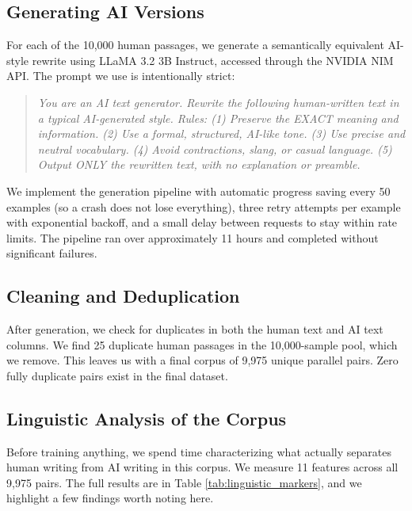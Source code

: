 \documentclass{article}
\begin{document}
\subsection{Generating AI Versions}

For each of the 10,000 human passages, we generate a semantically equivalent AI-style rewrite using LLaMA 3.2 3B Instruct, accessed through the NVIDIA NIM API. The prompt we use is intentionally strict:

\begin{quote}
\textit{You are an AI text generator. Rewrite the following human-written text in a typical AI-generated style. Rules: (1) Preserve the EXACT meaning and information. (2) Use a formal, structured, AI-like tone. (3) Use precise and neutral vocabulary. (4) Avoid contractions, slang, or casual language. (5) Output ONLY the rewritten text, with no explanation or preamble.}
\end{quote}

We implement the generation pipeline with automatic progress saving every 50 examples (so a crash does not lose everything), three retry attempts per example with exponential backoff, and a small delay between requests to stay within rate limits. The pipeline ran over approximately 11 hours and completed without significant failures.

\subsection{Cleaning and Deduplication}

After generation, we check for duplicates in both the human text and AI text columns. We find 25 duplicate human passages in the 10,000-sample pool, which we remove. This leaves us with a final corpus of 9,975 unique parallel pairs. Zero fully duplicate pairs exist in the final dataset.

\subsection{Linguistic Analysis of the Corpus}

Before training anything, we spend time characterizing what actually separates human writing from AI writing in this corpus. We measure 11 features across all 9,975 pairs. The full results are in Table \ref{tab:linguistic_markers}, and we highlight a few findings worth noting here.
\end{document}
